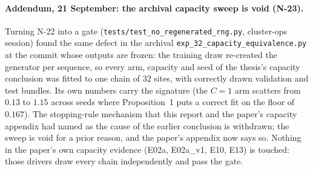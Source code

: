 \paragraph{Addendum, 21 September: the archival capacity sweep is void (N-23).} Turning N-22 into a gate (\texttt{tests/test\_no\_regenerated\_rng.py}, cluster-ops session) found the same defect in the archival \texttt{exp\_32\_capacity\_equivalence.py} at the commit whose outputs are frozen: the training draw re-created the generator per sequence, so every arm, capacity and seed of the thesis's capacity conclusion was fitted to one chain of $32$ sites, with correctly drawn validation and test bundles. Its own numbers carry the signature (the $C=1$ arm scatters from $0.13$ to $1.15$ across seeds where Proposition~1 puts a correct fit on the floor of $0.167$). The stopping-rule mechanism that this report and the paper's capacity appendix had named as the cause of the earlier conclusion is withdrawn; the sweep is void for a prior reason, and the paper's appendix now says so. Nothing in the paper's own capacity evidence (E02a, E02a\_v1, E10, E13) is touched: those drivers draw every chain independently and pass the gate.
